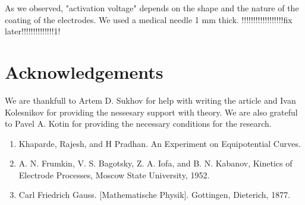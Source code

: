 \documentclass{article}
\begin{document}
As we observed, "activation voltage" depends on the shape and the nature of the coating of the electrodes. We used a medical needle 1 mm thick. !!!!!!!!!!!!!!!!!!fix later!!!!!!!!!!!!!!1!


\section{Acknowledgements}
We are thankfull to Artem D. Sukhov for help with writing the article and Ivan Kolesnikov for providing the nessesary support with theory. We are also grateful to Pavel A. Kotin for providing the necessary conditions for the research.



  
  
\begin{enumerate}
\item Khaparde, Rajesh, and H Pradhan. An Experiment on Equipotential Curves.
\item A. N. Frumkin, V. S. Bagotsky, Z. A. Iofa, and B. N. Kabanov, Kinetics of Electrode Processes, Moscow State University, 1952.
\item Carl Friedrich Gauss. [Mathematische Physik]. Gottingen, Dieterich, 1877.

\end{enumerate}
\end{document}
